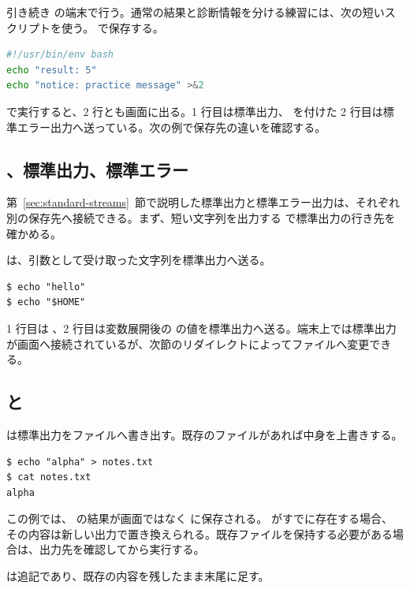 引き続き  の端末で行う。通常の結果と診断情報を分ける練習には、次の短いスクリプトを使う。 で保存する。

\begin{lstlisting}[language=bash, title={emit.sh}]
#!/usr/bin/env bash
echo "result: 5"
echo "notice: practice message" >&2
\end{lstlisting}

 で実行すると、2 行とも画面に出る。1 行目は標準出力、 を付けた 2 行目は標準エラー出力へ送っている。次の例で保存先の違いを確認する。

\subsection{、標準出力、標準エラー}

第~\ref{sec:standard-streams}~節で説明した標準出力と標準エラー出力は、それぞれ別の保存先へ接続できる。まず、短い文字列を出力する  で標準出力の行き先を確かめる。

 は、引数として受け取った文字列を標準出力へ送る。

\begin{lstlisting}[numbers=none, xleftmargin=2\zw]
$ echo "hello"
$ echo "$HOME"
\end{lstlisting}

1 行目は 、2 行目は変数展開後の  の値を標準出力へ送る。端末上では標準出力が画面へ接続されているが、次節のリダイレクトによってファイルへ変更できる。

\subsection{\code{>} と \code{>>}}

\code{>} は標準出力をファイルへ書き出す。既存のファイルがあれば中身を上書きする。

\begin{lstlisting}[numbers=none, xleftmargin=2\zw]
$ echo "alpha" > notes.txt
$ cat notes.txt
alpha
\end{lstlisting}

この例では、 の結果が画面ではなく  に保存される。 がすでに存在する場合、その内容は新しい出力で置き換えられる。既存ファイルを保持する必要がある場合は、出力先を確認してから実行する。

\code{>>} は追記であり、既存の内容を残したまま末尾に足す。

